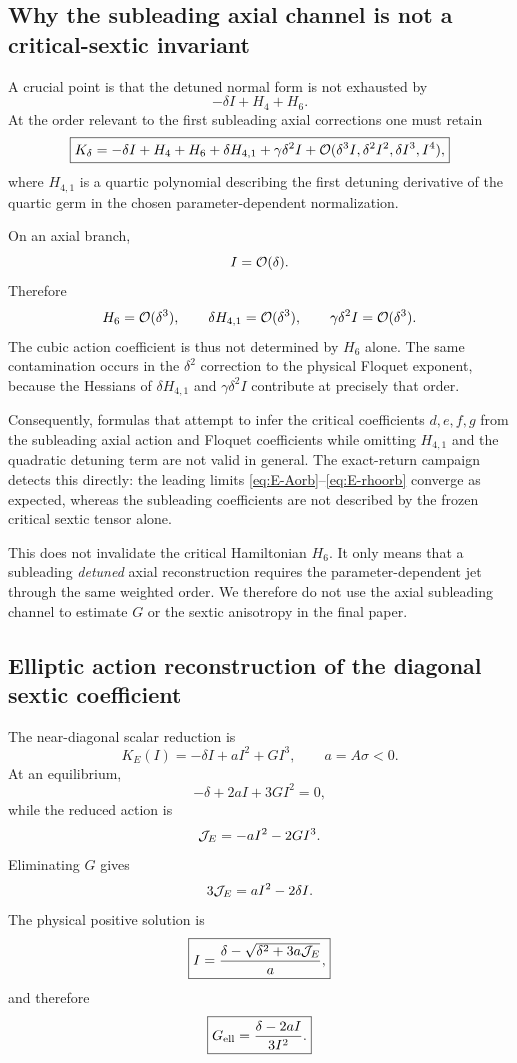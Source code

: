 \subsection{Why the subleading axial channel is not a critical-sextic invariant}
\label{app:axial-contamination}

A crucial point is that the detuned normal form is not exhausted by
\[
-\delta I+H_4+H_6.
\]
At the order relevant to the first subleading axial corrections one must retain
\begin{equation}
\boxed{
K_\delta
=
-\delta I
+H_4
+H_6
+\delta H_{4,1}
+\gamma\delta^2 I
+\mathcal{O}(\delta^3I,\delta^2I^2,\delta I^3,I^4),
}
\label{eq:E-extended-detuning}
\end{equation}
where $H_{4,1}$ is a quartic polynomial describing the first detuning derivative of the quartic germ in the chosen parameter-dependent normalization.

On an axial branch,
\[
I=\mathcal{O}(\delta).
\]
Therefore
\[
H_6=\mathcal{O}(\delta^3),
\qquad
\delta H_{4,1}=\mathcal{O}(\delta^3),
\qquad
\gamma\delta^2I=\mathcal{O}(\delta^3).
\]
The cubic action coefficient is thus not determined by $H_6$ alone.  The same contamination occurs in the $\delta^2$ correction to the physical Floquet exponent, because the Hessians of $\delta H_{4,1}$ and $\gamma\delta^2I$ contribute at precisely that order.

Consequently, formulas that attempt to infer the critical coefficients $d,e,f,g$ from the subleading axial action and Floquet coefficients while omitting $H_{4,1}$ and the quadratic detuning term are not valid in general.  The exact-return campaign detects this directly: the leading limits \eqref{eq:E-Aorb}--\eqref{eq:E-rhoorb} converge as expected, whereas the subleading coefficients are not described by the frozen critical sextic tensor alone.

This does not invalidate the critical Hamiltonian $H_6$.  It only means that a subleading \emph{detuned} axial reconstruction requires the parameter-dependent jet through the same weighted order.  We therefore do not use the axial subleading channel to estimate $G$ or the sextic anisotropy in the final paper.

\subsection{Elliptic action reconstruction of the diagonal sextic coefficient}

The near-diagonal scalar reduction is
\[
K_E(I)
=-\delta I+aI^2+GI^3,
\qquad
a=A\sigma<0.
\]
At an equilibrium,
\[
-\delta+2aI+3GI^2=0,
\]
while the reduced action is
\[
\mathcal{J}_E=-aI^2-2GI^3.
\]
Eliminating $G$ gives
\[
3\mathcal{J}_E=aI^2-2\delta I.
\]
The physical positive solution is
\begin{equation}
\boxed{
I
=
\frac{\delta-\sqrt{\delta^2+3a\mathcal{J}_E}}{a},
}
\label{eq:E-I-from-action}
\end{equation}
and therefore
\begin{equation}
\boxed{
G_{\rm ell}
=
\frac{\delta-2aI}{3I^2}.
}
\label{eq:E-Gell}
\end{equation}

